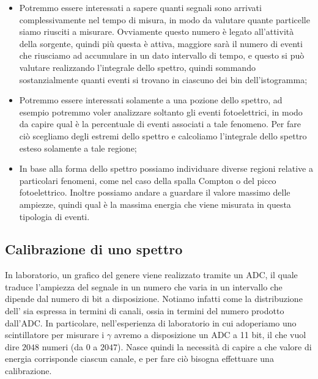 \begin{itemize}[leftmargin=0.5cm]
   \item Potremmo essere interessati a sapere quanti segnali sono arrivati complessivamente nel tempo di misura, in modo da valutare quante particelle siamo riusciti a misurare. Ovviamente questo numero è legato all'attività della sorgente, quindi più questa è attiva, maggiore sarà il numero di eventi che riusciamo ad accumulare in un dato intervallo di tempo, e questo si può valutare realizzando l'integrale dello spettro, quindi sommando sostanzialmente quanti eventi si trovano in ciascuno dei bin dell'istogramma;
   \item Potremmo essere interessati solamente a una pozione dello spettro, ad esempio potremmo voler analizzare soltanto gli eventi fotoelettrici, in modo da capire qual è la percentuale di eventi associati a tale fenomeno. Per fare ciò scegliamo degli estremi dello spettro e calcoliamo l'integrale dello spettro esteso solamente a tale regione;
   \item In base alla forma dello spettro possiamo individuare diverse regioni relative a particolari fenomeni, come nel caso della spalla Compton o del picco fotoelettrico. Inoltre possiamo andare a guardare il valore massimo delle ampiezze, quindi qual è la massima energia che viene misurata in questa tipologia di eventi.
\end{itemize}

\subsection{Calibrazione di uno spettro}

In laboratorio, un grafico del genere viene realizzato tramite un ADC, il quale traduce l'ampiezza del segnale in un numero che varia in un intervallo che dipende dal numero di bit a disposizione. Notiamo infatti come la distribuzione dell' sia espressa in termini di canali, ossia in termini del numero prodotto dall'ADC. In particolare, nell'esperienza di laboratorio in cui adoperiamo uno scintillatore per misurare i $\gamma$ avremo a disposizione un ADC a 11 bit, il che vuol dire $2048$ numeri (da $0$ a $2047$). Nasce quindi la necessità di capire a che valore di energia corrisponde ciascun canale, e per fare ciò bisogna effettuare una calibrazione.

